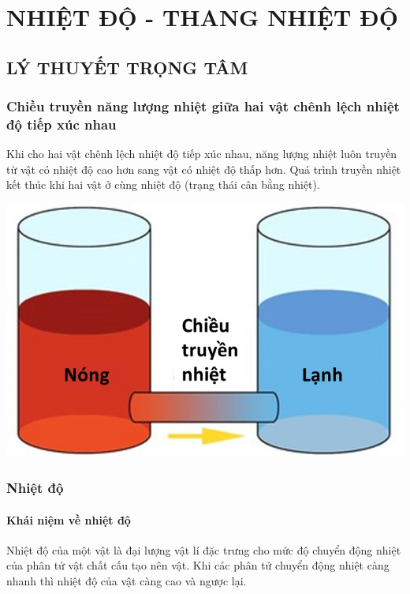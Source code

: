 \section{NHIỆT ĐỘ - THANG NHIỆT ĐỘ}
\subsection{LÝ THUYẾT TRỌNG TÂM}
\begin{tomtat}
\subsubsection{Chiều truyền năng lượng nhiệt giữa hai vật chênh lệch nhiệt độ tiếp xúc nhau}
\begin{boxdn}
	Khi cho hai vật chênh lệch nhiệt độ tiếp xúc nhau, năng lượng nhiệt luôn truyền từ vật có nhiệt độ cao hơn sang vật có nhiệt độ thấp hơn. Quá trình truyền nhiệt kết thúc khi hai vật ở cùng nhiệt độ (trạng thái cân bằng nhiệt).
\end{boxdn}
\begin{center}
	\includegraphics[width=0.3\linewidth]{figs/VN12-Y24-PH-SYL-002-1}
\end{center}
\subsubsection{Nhiệt độ}
\paragraph{Khái niệm về nhiệt độ}
\begin{dn}
	Nhiệt độ của một vật là đại lượng vật lí đặc trưng cho mức độ chuyển động nhiệt của phân tử vật chất cấu tạo nên vật. Khi các phân tử chuyển động nhiệt càng nhanh thì nhiệt độ của vật càng cao và ngược lại.
\end{dn}

\end{tomtat}
